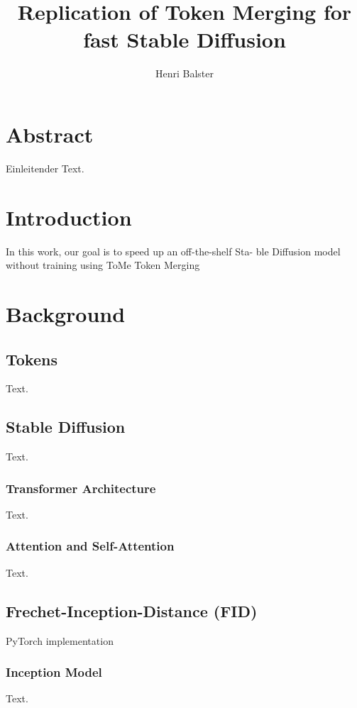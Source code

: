 \documentclass{article}
\title{{\myfont Replication of Token Merging for fast Stable Diffusion}}
\author{Henri Balster}
\date{}
\begin{document}
\maketitle

\tableofcontents

\section*{Abstract}
Einleitender Text.





\newpage
\section{Introduction}
In this work, our goal is to speed up an off-the-shelf Sta-
ble Diffusion model without training using ToMe
Token Merging \cite{bolya2023tomesd}





\newpage
\section{Background}
\subsection{Tokens}
Text.

\subsection{Stable Diffusion}
Text.

\subsubsection{Transformer Architecture}
Text.

\subsubsection{Attention and Self-Attention}
Text.

\subsection{Frechet-Inception-Distance (FID)}
PyTorch implementation \cite{Seitzer2020FID}

\subsubsection{Inception Model}
Text.
\end{document}
